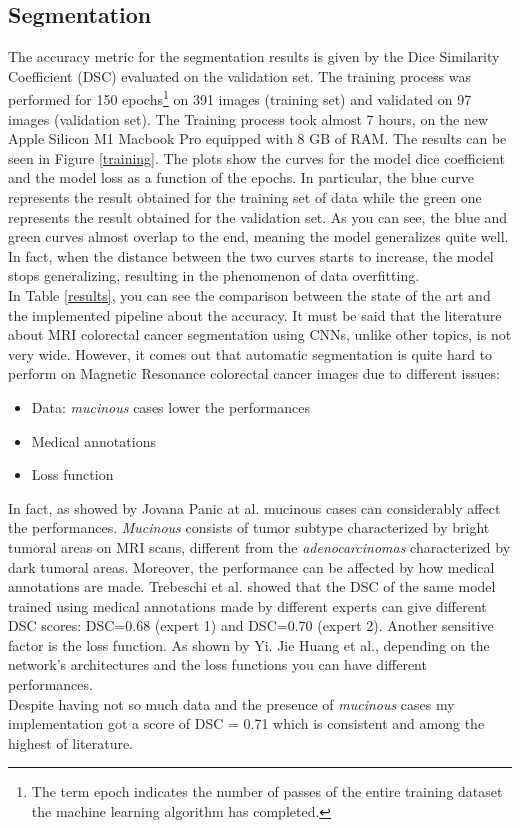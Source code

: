 \documentclass{standalone}
\begin{document}
\subsection{Segmentation}

The accuracy metric for the segmentation results is given by the Dice Similarity Coefficient (DSC) evaluated on the validation set.
The training process was performed for 150 epochs\footnote{The term epoch indicates the number of passes of the entire training dataset the machine learning algorithm has completed.} on 391 images (training set) and validated on 97 images (validation set).
The Training process took almost 7 hours, on the new Apple Silicon M1 Macbook Pro equipped with 8 GB of RAM.
The results can be seen in Figure \ref{training}.
The plots show the curves for the model dice coefficient and the model loss as a function of the epochs.
In particular, the blue curve represents the result obtained for the training set of data while the green one represents the result obtained for the validation set.
As you can see, the blue and green curves almost overlap to the end, meaning the model generalizes quite well.
In fact, when the distance between the two curves starts to increase, the model stops generalizing, resulting in the phenomenon of data overfitting.
\\
In Table \ref{results}, you can see the comparison between the state of the art and the implemented pipeline about the accuracy.
It must be said that the literature about MRI colorectal cancer segmentation using CNNs, unlike other topics, is not very wide.
However, it comes out that automatic segmentation is quite hard to perform on Magnetic Resonance colorectal cancer images due to different issues: 
\begin{itemize}
	\item Data: \textit{mucinous} cases lower the performances
	\item Medical annotations
	\item Loss function
\end{itemize}

In fact, as showed by Jovana Panic at al.\cite{jpanic} mucinous cases can considerably affect the performances.
\textit{Mucinous} consists of tumor subtype characterized by bright tumoral areas on MRI scans, different from the \textit{adenocarcinomas} characterized by dark tumoral areas.
Moreover, the performance can be affected by how medical annotations are made.
Trebeschi et al. \cite{Trebeschi2017} showed that the DSC of the same model trained using medical annotations made by different experts can give different DSC scores: DSC=0.68 (expert 1) and DSC=0.70 (expert 2).
Another sensitive factor is the loss function. 
As shown by Yi. Jie Huang et al.\cite{YiJieHuang}, depending on the network's architectures and the loss functions you can have different performances.\\
Despite having not so much data and the presence of \textit{mucinous} cases my implementation got a score of DSC = 0.71 which is consistent and among the highest of literature.
 
\end{document}
